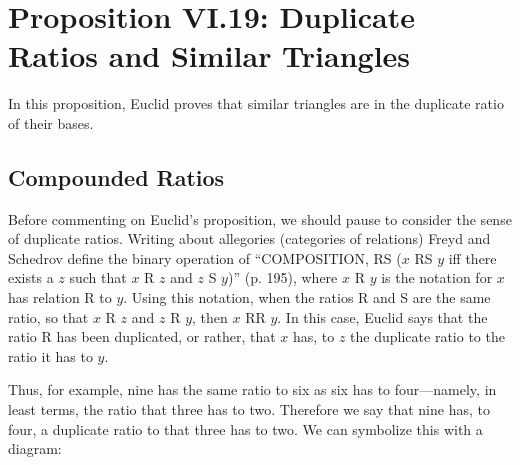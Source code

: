 \documentclass[11pt]{article}
\begin{document}
\section{Proposition VI.19: Duplicate Ratios and Similar Triangles}

In this proposition, Euclid proves that similar triangles are in the duplicate ratio of their bases.

\subsection{Compounded Ratios}
Before commenting on Euclid's proposition, we should pause to consider the sense of duplicate ratios. Writing about allegories (categories of relations) Freyd and Schedrov \citep{freyd-scedrov1990} define the binary operation of ``COMPOSITION, RS ($x$ RS $y$ iff there exists a $z$ such that $x$ R $z$ and $z$ S $y$)'' (p. 195), where $x$ R $y$ is the notation for $x$ has relation R to $y$. Using this notation, when the ratios R and S are the same ratio, so that $x$ R $z$ and $z$ R $y$, then $x$ RR $y$. In this case, Euclid says that the ratio R has been duplicated, or rather, that $x$ has, to $z$ the duplicate ratio to the ratio it has to $y$.

Thus, for example, nine has the same ratio to six as six has to four---namely, in least terms, the ratio that three has to two. Therefore we say that nine has, to four, a duplicate ratio to that three has to two. We can symbolize this with a diagram:

\centering%
\end{document}
